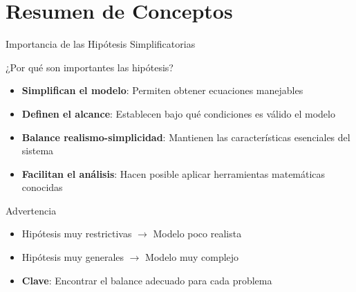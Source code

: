 \documentclass[
    10pt,
    aspectratio=169,
    xcolor={dvipsnames},
    spanish,
    ]{beamer}
\begin{document}
\section{Resumen de Conceptos}

\begin{frame}{Importancia de las Hipótesis Simplificatorias}
\begin{block}{¿Por qué son importantes las hipótesis?}
  \begin{itemize}
    \item \textbf{Simplifican el modelo}: Permiten obtener ecuaciones manejables
    \item \textbf{Definen el alcance}: Establecen bajo qué condiciones es válido el modelo
    \item \textbf{Balance realismo-simplicidad}: Mantienen las características esenciales del sistema
    \item \textbf{Facilitan el análisis}: Hacen posible aplicar herramientas matemáticas conocidas
  \end{itemize}
\end{block}

\begin{alertblock}{Advertencia}
  \begin{itemize}
    \item Hipótesis muy restrictivas $\rightarrow$ Modelo poco realista
    \item Hipótesis muy generales $\rightarrow$ Modelo muy complejo
    \item \textbf{Clave}: Encontrar el balance adecuado para cada problema
  \end{itemize}
\end{alertblock}
\end{frame}
\end{document}
